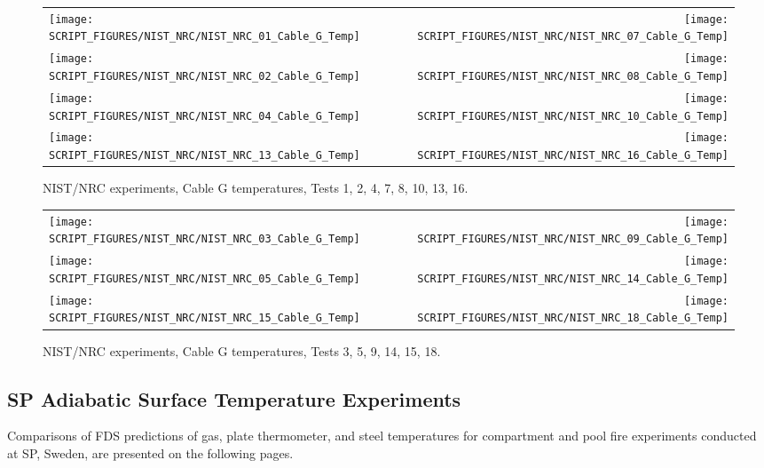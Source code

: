 \begin{figure}[p]
\begin{tabular*}{\textwidth}{l@{\extracolsep{\fill}}r}
\texttt{[image: SCRIPT\_FIGURES/NIST\_NRC/NIST\_NRC\_01\_Cable\_G\_Temp]} &
\texttt{[image: SCRIPT\_FIGURES/NIST\_NRC/NIST\_NRC\_07\_Cable\_G\_Temp]} \\
\texttt{[image: SCRIPT\_FIGURES/NIST\_NRC/NIST\_NRC\_02\_Cable\_G\_Temp]} &
\texttt{[image: SCRIPT\_FIGURES/NIST\_NRC/NIST\_NRC\_08\_Cable\_G\_Temp]} \\
\texttt{[image: SCRIPT\_FIGURES/NIST\_NRC/NIST\_NRC\_04\_Cable\_G\_Temp]} &
\texttt{[image: SCRIPT\_FIGURES/NIST\_NRC/NIST\_NRC\_10\_Cable\_G\_Temp]} \\
\texttt{[image: SCRIPT\_FIGURES/NIST\_NRC/NIST\_NRC\_13\_Cable\_G\_Temp]} &
\texttt{[image: SCRIPT\_FIGURES/NIST\_NRC/NIST\_NRC\_16\_Cable\_G\_Temp]}
\end{tabular*}
\caption{NIST/NRC experiments, Cable G temperatures, Tests 1, 2, 4, 7, 8, 10, 13, 16.}
\label{NIST_NRC_Cable_G_Closed}
\end{figure}

\begin{figure}[p]
\begin{tabular*}{\textwidth}{l@{\extracolsep{\fill}}r}
\texttt{[image: SCRIPT\_FIGURES/NIST\_NRC/NIST\_NRC\_03\_Cable\_G\_Temp]} &
\texttt{[image: SCRIPT\_FIGURES/NIST\_NRC/NIST\_NRC\_09\_Cable\_G\_Temp]} \\
\texttt{[image: SCRIPT\_FIGURES/NIST\_NRC/NIST\_NRC\_05\_Cable\_G\_Temp]} &
\texttt{[image: SCRIPT\_FIGURES/NIST\_NRC/NIST\_NRC\_14\_Cable\_G\_Temp]} \\
\texttt{[image: SCRIPT\_FIGURES/NIST\_NRC/NIST\_NRC\_15\_Cable\_G\_Temp]} &
\texttt{[image: SCRIPT\_FIGURES/NIST\_NRC/NIST\_NRC\_18\_Cable\_G\_Temp]}
\end{tabular*}
\caption{NIST/NRC experiments, Cable G temperatures, Tests 3, 5, 9, 14, 15, 18.}
\label{NIST_NRC_Cable_G_Open}
\end{figure}

\clearpage

\subsection{SP Adiabatic Surface Temperature Experiments}

Comparisons of FDS predictions of gas, plate thermometer, and steel temperatures for compartment and pool fire experiments conducted at SP, Sweden, are
presented on the following pages.

